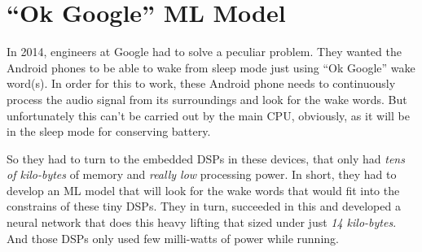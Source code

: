 \documentclass[../../main]{subfiles}
\begin{document}
\section{``Ok Google'' ML Model} \label{sec:}

In 2014, engineers at Google had to solve a peculiar problem. They
wanted the Android phones to be able to wake from sleep mode just using
``Ok Google'' wake word(s). In order for this to work, these Android
phone needs to continuously process the audio signal from its surroundings
and look for the wake words. But unfortunately this can't be carried
out by the main CPU, obviously, as it will be in the sleep mode for
conserving battery.

So they had to turn to the embedded DSPs in these devices, that only had
\emph{tens of kilo-bytes} of memory and \emph{really low} processing power.
In short, they had to develop an ML model that will look for the wake words
that would fit into the constrains of these tiny DSPs. They in turn, succeeded
in this and developed a neural network that does this heavy lifting that sized under
just \emph{14 kilo-bytes}. And those DSPs only used few milli-watts of power
while running.
\end{document}
